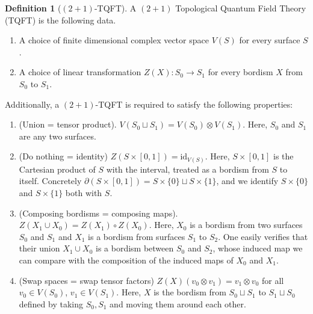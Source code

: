 \documentclass{article}
\theoremstyle{definition}
\newtheorem*{definition}{Definition}
\numberwithin{figure}{section}
\begin{document}
\begin{definition}[$(2+1)$-TQFT] A $(2+1)$ Topological Quantum Field Theory (TQFT) is the following data.
\begin{enumerate}
\item A choice of finite dimensional complex vector space $V(S)$ for every surface $S$.
\item A choice of linear transformation $Z(X): S_0\xrightarrow{} S_1$ for every bordism $X$ from $S_0$ to $S_1$.
\end{enumerate}
Additionally, a $(2+1)$-TQFT is required to satisfy the following properties:
\begin{enumerate}

\item (Union = tensor product). $V(S_0\sqcup S_1)=V(S_0)\otimes V(S_1)$. Here, $S_0$ and $S_1$ are any two surfaces.

\item (Do nothing = identity) $Z(S\times [0,1])=\text{id}_{V(S)}$. Here, $S\times [0,1]$ is the Cartesian product of $S$ with the interval, treated as a bordism from $S$ to itself. Concretely $\partial (S\times [0,1])=S\times\{0\}\sqcup S\times\{1\}$, and we identify $S\times \{0\}$ and $S\times\{1\}$ both with $S$.

\item (Composing bordisms = composing maps). $Z(X_1\cup X_0)=Z(X_1)\circ Z(X_0)$. Here, $X_0$ is a bordism from two surfaces $S_0$ and $S_1$ and $X_1$ is a bordism from surfaces $S_1$ to $S_2$. One easily verifies that their union $X_1\cup X_0$ is a bordism between $S_0$ and $S_2$, whose induced map we can compare with the composition of the induced maps of $X_0$ and $X_1$.

\item (Swap spaces = swap tensor factors) $Z(X)(v_0\otimes v_1)=v_1\otimes v_0$ for all $v_0\in V(S_0)$, $v_1\in V(S_1)$. Here, $X$ is the bordism from $S_0\sqcup S_1$ to $S_1\sqcup S_0$ defined by taking $S_0,S_1$ and moving them around each other. 
\end{enumerate}

\raggedleft\qedsymbol{}

\end{definition}
\end{document}
